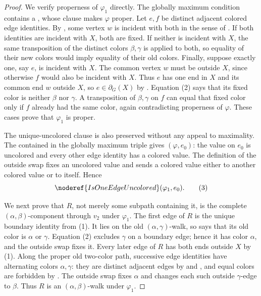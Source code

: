 \begin{proof}
We verify properness of $\varphi_1$ directly.  The globally maximum
condition  contains a
, whose  clause makes
$\varphi$ proper.  Let $e,f$ be distinct adjacent colored edge identities.
By , some vertex $w$ is incident with both in the
sense of .  If both identities are incident with $X$,
both are fixed.  If neither is incident with $X$, the same transposition
of the distinct colors $\beta,\gamma$ is applied to both, so equality of
their new colors would imply equality of their old colors.  Finally,
suppose exactly one, say $e$, is incident with $X$.  The common vertex
$w$ must be outside $X$, since otherwise $f$ would also be incident with
$X$.  Thus $e$ has one end in $X$ and its common end $w$ outside $X$, so
$e\in\partial_G(X)$ by .  Equation (2) says that
its fixed color is neither $\beta$ nor $\gamma$.  A transposition of
$\beta,\gamma$ on $f$ can equal that fixed color only if $f$ already had
the same color, again contradicting properness of $\varphi$.  These cases
prove that $\varphi_1$ is proper.

The unique-uncolored clause is also preserved without any appeal to
maximality.  The  contained in the globally maximum
triple gives $(\varphi,e_0)$: the value on
$e_0$ is uncolored and every other edge identity has a colored value.
The definition of the outside swap fixes an uncolored value and sends a
colored value either to another colored value or to itself.  Hence
\[
 \noderef{IsOneEdgeUncolored}(\varphi_1,e_0).                    \tag{3}
\]

We next prove that $R$, not merely some subpath containing it, is the
complete $(\alpha,\beta)$-component through $v_2$ under $\varphi_1$.
The first edge of $R$ is the unique boundary identity from (1).  It lies
on the old $(\alpha,\gamma)$-walk, so
 says that its old color is $\alpha$ or
$\gamma$.  Equation (2) excludes $\gamma$ on a boundary edge; hence it
has color $\alpha$, and the outside swap fixes it.  Every later edge of
$R$ has both ends outside $X$ by (1).  Along the proper old two-color path,
successive edge identities have alternating colors $\alpha,\gamma$:
they are distinct adjacent edges by  and
, and equal colors are forbidden by
.  The outside swap fixes $\alpha$ and
changes each such outside $\gamma$-edge to $\beta$.  Thus $R$ is an
$(\alpha,\beta)$-walk under $\varphi_1$.


\end{proof}
